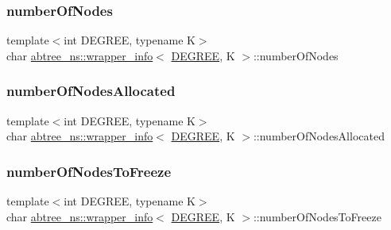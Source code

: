 \mbox{\label{classabtree__ns_1_1wrapper__info_a43563c0b9d50c77a1619f219e09a6eb0}} 
\subsubsection{\texorpdfstring{number\+Of\+Nodes}{numberOfNodes}}
{\footnotesize\ttfamily template$<$int D\+E\+G\+R\+EE, typename K$>$ \\
char \hyperlink{classabtree__ns_1_1wrapper__info}{abtree\+\_\+ns\+::wrapper\+\_\+info}$<$ \hyperlink{brown__sigouin__abtree__kcas_2adapter_8h_a5d88b17d70c985f2f2b8e987037fd6dd}{D\+E\+G\+R\+EE}, K $>$\+::number\+Of\+Nodes}

\mbox{\label{classabtree__ns_1_1wrapper__info_aa902b7a21461bae3975b67ba4f39a6c6}} 
\subsubsection{\texorpdfstring{number\+Of\+Nodes\+Allocated}{numberOfNodesAllocated}}
{\footnotesize\ttfamily template$<$int D\+E\+G\+R\+EE, typename K$>$ \\
char \hyperlink{classabtree__ns_1_1wrapper__info}{abtree\+\_\+ns\+::wrapper\+\_\+info}$<$ \hyperlink{brown__sigouin__abtree__kcas_2adapter_8h_a5d88b17d70c985f2f2b8e987037fd6dd}{D\+E\+G\+R\+EE}, K $>$\+::number\+Of\+Nodes\+Allocated}

\mbox{\label{classabtree__ns_1_1wrapper__info_a6f82a59bb872ece248f3a6603404f289}} 
\subsubsection{\texorpdfstring{number\+Of\+Nodes\+To\+Freeze}{numberOfNodesToFreeze}}
{\footnotesize\ttfamily template$<$int D\+E\+G\+R\+EE, typename K$>$ \\
char \hyperlink{classabtree__ns_1_1wrapper__info}{abtree\+\_\+ns\+::wrapper\+\_\+info}$<$ \hyperlink{brown__sigouin__abtree__kcas_2adapter_8h_a5d88b17d70c985f2f2b8e987037fd6dd}{D\+E\+G\+R\+EE}, K $>$\+::number\+Of\+Nodes\+To\+Freeze}

